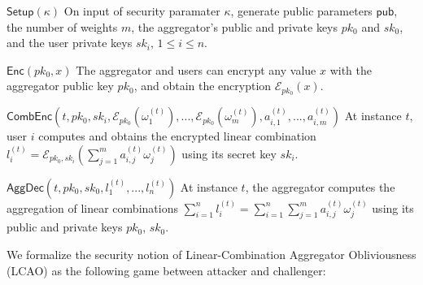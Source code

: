 \documentclass[10pt,letterpaper,oneside,twocolumn,journal]{IEEEtran}
\theoremstyle{definition}
\theoremstyle{definition}
\theoremstyle{remark}
\newcommand\shrtdots{\!...}
\begin{document}
\begin{LaTeXdescription}
    \item[$\mathsf{Setup}(\kappa)$] On input of security paramater $\kappa$, generate public parameters $\mathsf{pub}$, the number of weights $m$, the aggregator's public and private keys $pk_0$ and $sk_0$, and the user private keys $sk_i,\,1\leq i \leq n$.
    \item[$\mathsf{Enc}(pk_0, x)$] The aggregator and users can encrypt any value $x$ with the aggregator public key $pk_0$, and obtain the encryption $\mathcal{E}_{pk_0}(x)$.
    \item[$\mathsf{CombEnc}(t, pk_0, sk_i, \mathcal{E}_{pk_0}(\omega_1^{(t)}),\shrtdots,\mathcal{E}_{pk_0}(\omega_m^{(t)}), a^{(t)}_{i,1},\shrtdots,a^{(t)}_{i,m})$] At instance $t$, user $i$ computes and obtains the encrypted linear combination $l^{(t)}_i = \mathcal{E}_{pk_0,sk_i}(\sum^m_{j=1}a^{(t)}_{i,j}\omega^{(t)}_j)$ using its secret key $sk_i$.
    \item[$\mathsf{AggDec}(t, pk_0, sk_0, l^{(t)}_1,\shrtdots,l^{(t)}_n)$] At instance $t$, the aggregator computes the aggregation of linear combinations $\sum^{n}_{i=1}l_i^{(t)}=\sum^{n}_{i=1}\sum^{m}_{j=1} a^{(t)}_{i,j}\omega^{(t)}_j$ using its public and private keys $pk_0$, $sk_0$.
\end{LaTeXdescription}

We formalize the security notion of Linear-Combination Aggregator Obliviousness (LCAO) as the following game between attacker and challenger:
\end{document}
